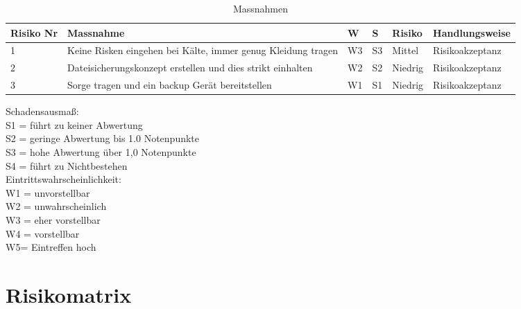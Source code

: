 \bigbreak
\begin{table}[H]
    \begin{tabular}{ |C{0.1\textwidth}|C{0.3\textwidth}|C{0.1\textwidth}|C{0.1\textwidth}|C{0.1\textwidth}|C{0.2\textwidth}| }
        \hline
        Risiko Nr & Massnahme &  W & S & Risiko & Handlungsweise \\
         & Keine Risken eingehen bei Kälte, immer genug Kleidung tragen 
        & W3 & S3 & Mittel & Risikoakzeptanz \\
         & Dateisicherungskonzept erstellen und dies strikt einhalten 
        & W2 & S2 & Niedrig & Risikoakzeptanz \\
         & Sorge tragen und ein backup Gerät bereitstellen 
        & W1 & S1 & Niedrig & Risikoakzeptanz \\
        \hline
    \end{tabular}
    \caption{Massnahmen}
\end{table}
Schadensausmaß: \\
S1 = führt zu keiner Abwertung \\
S2 = geringe Abwertung bis 1.0 Notenpunkte \\
S3 = hohe Abwertung über 1,0 Notenpunkte \\
S4 = führt zu Nichtbestehen \\
\newline
Eintrittswahrscheinlichkeit: \\
W1 = unvorstellbar \\
W2 = unwahrscheinlich \\
W3 = eher vorstellbar \\
W4 = vorstellbar \\
W5= Eintreffen hoch \\

\section{Risikomatrix}


